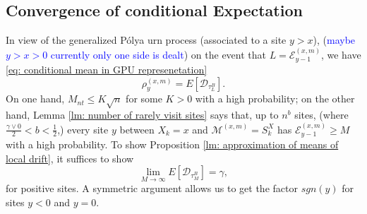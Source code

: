 \documentclass[twoside,12pt,a4paper]{article}
\numberwithin{equation}{section}
\newcommand{\comment}[1]{\textcolor{blue}{#1}}
\begin{document}
		
		\subsection{Convergence of conditional Expectation}
		In view of the generalized P\'{o}lya urn process (associated to a site $y> x$), (\comment{maybe $ y>x>0 $ currently only one side is dealt}) on the event that $ L = \mathcal{E}^{(x,m)}_{y-1}$, we have \eqref{eq: conditional mean in GPU represenetation} 
		$$\rho^{(x,m)}_y = E[\mathcal{D}_{\tau_L^B}].$$ 
		On one hand, $M_{nt} \leq K\sqrt{n} $ for some $K>0$ with a high probability; on the other hand, Lemma \ref{lm: number of rarely visit sites} says that, up to $n^b$ sites, (where $\frac{\gamma \vee 0}{2}<b<\frac{1}{2}$,) every site $y$ between $X_k=x$ and $\mathcal{M}^{(x,m)} =S_{k}^X$ has $ \mathcal{E}^{(x,m)}_{y-1} \geq M  $ with a high probability. To show Proposition \ref{lm: approximation of means of local drift}, it suffices to show 
		\begin{equation}\label{eq: convergence of conditional expectation}
			\lim_{M\to\infty} E[\mathcal{D}_{\tau_M^B}] = \gamma , 
		\end{equation} for positive sites. A symmetric argument allows us to get the factor $sgn(y)$ for sites $y<0$ and $y=0$.
		
\end{document}

